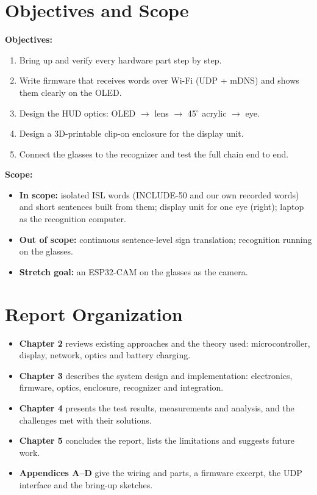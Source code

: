 \documentclass[12pt,a4paper]{report}
\begin{document}
\section{Objectives and Scope}

\textbf{Objectives:}
\begin{enumerate}
  \item Bring up and verify every hardware part step by step.
  \item Write firmware that receives words over Wi-Fi (UDP + mDNS) and shows them clearly on the OLED.
  \item Design the HUD optics: OLED $\rightarrow$ lens $\rightarrow$ 45$^\circ$ acrylic $\rightarrow$ eye.
  \item Design a 3D-printable clip-on enclosure for the display unit.
  \item Connect the glasses to the recognizer and test the full chain end to end.
\end{enumerate}

\textbf{Scope:}
\begin{itemize}
  \item \textbf{In scope:} isolated ISL words (INCLUDE-50 \cite{include} and our own recorded words) and short sentences built from them; display unit for one eye (right); laptop as the recognition computer.
  \item \textbf{Out of scope:} continuous sentence-level sign translation; recognition running on the glasses.
  \item \textbf{Stretch goal:} an ESP32-CAM on the glasses as the camera.
\end{itemize}

\section{Report Organization}
\begin{itemize}
  \item \textbf{Chapter 2} reviews existing approaches and the theory used: microcontroller, display, network, optics and battery charging.
  \item \textbf{Chapter 3} describes the system design and implementation: electronics, firmware, optics, enclosure, recognizer and integration.
  \item \textbf{Chapter 4} presents the test results, measurements and analysis, and the challenges met with their solutions.
  \item \textbf{Chapter 5} concludes the report, lists the limitations and suggests future work.
  \item \textbf{Appendices A--D} give the wiring and parts, a firmware excerpt, the UDP interface and the bring-up sketches.
\end{itemize}
\end{document}
